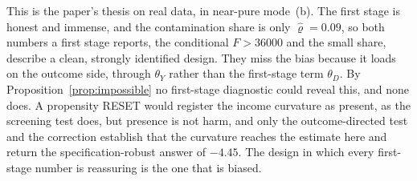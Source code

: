 \documentclass[preprint,11pt,authoryear]{elsarticle}
\theoremstyle{definition}
\begin{document}
\begin{table}[t]\centering
\caption{Spousal health insurance and wives' weekly hours ($n=\num{22272}$). Effect of
coverage by the husband's insurance, instrumented by the husband holding own-job
insurance. A conditional $F$ above \num{36000} does not prevent contamination under a
linear husband income control, and the correction recovers the flexible-income answer
without loss of identification. Test $p$-values from the pairs bootstrap. For the
corrected row, cond.\ $F$ is the corrected estimator's own first stage (regressing $D$
on the residualized instrument $Z-\hat e(X)$) and the bracketed interval is the pairs
bootstrap.}
\label{tab:hi}
\end{table}

This is the paper's thesis on real data, in near-pure mode~(b). The first stage is
honest and immense, and the contamination share is only $\hat\varrho=0.09$, so both
numbers a first stage reports, the conditional $F>\num{36000}$ and the small share,
describe a clean, strongly identified design. They miss the bias because it loads on
the outcome side, through $\theta_Y$ rather than the first-stage term $\theta_D$. By
Proposition~\ref{prop:impossible} no first-stage diagnostic could reveal this, and none
does. A propensity RESET would register the income curvature as present, as the
screening test does, but presence is not harm, and only the outcome-directed test and
the correction establish that the curvature reaches the estimate here and return the
specification-robust answer of $-4.45$. The design in which every first-stage number is
reassuring is the one that is biased.
\end{document}

